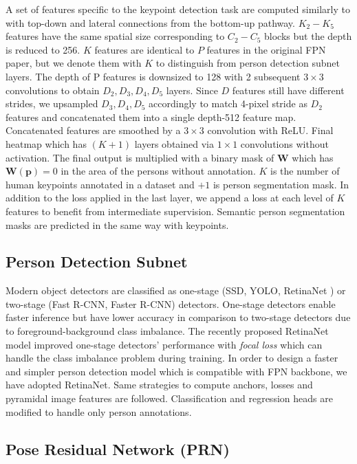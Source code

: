 \documentclass[runningheads]{llncs}
\begin{document}
A set of features specific to the keypoint detection task are computed similarly to \cite{Lina} with top-down and lateral connections from the bottom-up pathway. $K_2 - K_5$ features have the same spatial size corresponding to $C_2 - C_5$ blocks but the depth is reduced to 256. $K$ features are identical to $P$ features in the original FPN paper, but we denote them with  $K$ to distinguish from person detection subnet layers. The depth of P features is downsized to 128 with 2 subsequent $3 \times 3$ convolutions to obtain $D_2, D_3, D_4, D_5$ layers. Since $D$ features still have different strides, we upsampled $D_3, D_4, D_5$ accordingly to match 4-pixel stride as $D_2$ features and concatenated them into a single depth-512 feature map. Concatenated features are smoothed by a $3 \times 3$ convolution with ReLU. Final heatmap which has $(K+1)$ layers obtained via $1 \times 1$ convolutions without activation. The final output is multiplied with a binary mask of $\mathbf{W}$ which has $\mathbf{W}(\mathbf{p})=0$ in the area of the persons without annotation. $K$ is the number of human keypoints annotated in a dataset and $+1$ is person segmentation mask. In addition to the loss applied in the last layer, we append a loss at each level of $K$ features to benefit from intermediate supervision. Semantic person segmentation masks are predicted in the same way with keypoints.
\subsection{Person Detection Subnet}
Modern object detectors are classified as one-stage (SSD\cite{liu2016ssd}, YOLO\cite{redmon}, RetinaNet \cite{Lin2017}) or two-stage (Fast R-CNN\cite{girshick15fastrcnn}, Faster R-CNN\cite{ren2015faster}) detectors. One-stage detectors enable faster inference but have lower accuracy in comparison to two-stage detectors due to foreground-background class imbalance. The recently proposed RetinaNet \cite{Lin2017} model improved one-stage detectors'   performance with \textit{focal loss} which can handle the class imbalance problem during training. In order to design a faster and simpler person detection model which is compatible with FPN backbone, we have adopted RetinaNet. Same strategies to compute anchors, losses and pyramidal image features are followed. Classification and regression heads are modified to handle only person annotations.     




\subsection{Pose Residual Network (PRN)}
\label{sec:method-prn}
\end{document}
